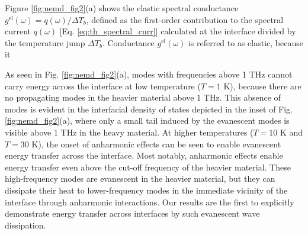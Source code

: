
Figure \ref{fig:nemd_fig2}(a) shows the elastic spectral conductance $g^{\textrm{el}}(\omega)=q(\omega)/\Delta T_b$, defined as the first-order contribution to the spectral current $q(\omega)$ [Eq. \eqref{eq:th_spectral_curr}] calculated at the interface divided by the temperature jump $\Delta T_b$. Conductance $g^{\textrm{el}}(\omega)$ is referred to as elastic, because it  %

As seen in Fig. \ref{fig:nemd_fig2}(a), modes with frequencies above 1 THz cannot carry energy across the interface at low temperature ($T=1$ K), because there are no propagating modes in the heavier material above 1 THz. This absence of modes is evident in the interfacial density of states depicted in the inset of Fig. \ref{fig:nemd_fig2}(a), where only a small tail induced by the evanescent modes is visible above 1 THz in the heavy material. At higher temperatures ($T=10$ K and $T=30$ K), the onset of anharmonic effects can be seen to enable evanescent energy transfer across the interface. Most notably, anharmonic effects enable energy transfer even above the cut-off frequency of the heavier material. These high-frequency modes are evanescent in the heavier material, but they can dissipate their heat to lower-frequency modes in the immediate vicinity of the interface through anharmonic interactions. Our results are the first to explicitly demonstrate energy transfer across interfaces by such evanescent wave dissipation.

